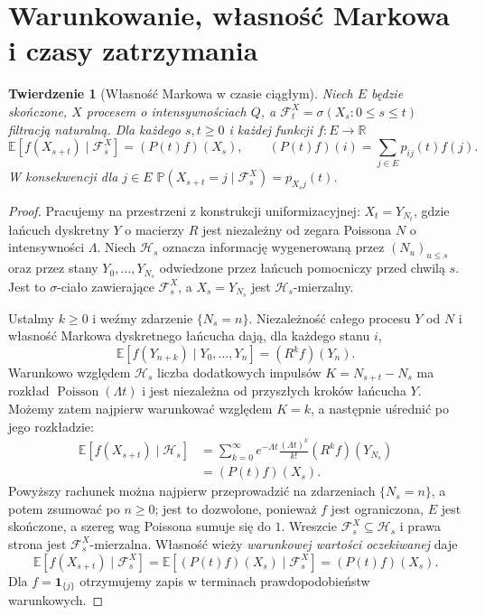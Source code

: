 \documentclass[11pt,a4paper,oneside]{report}
\numberwithin{equation}{chapter}
\theoremstyle{plain}
\newtheorem{twierdzenie}{Twierdzenie}[chapter]
\theoremstyle{definition}
\theoremstyle{remark}
\newcommand{\R}{\mathbb{R}}
\newcommand{\Prob}{\mathbb{P}}
\newcommand{\E}{\mathbb{E}}
\newcommand{\calF}{\mathcal{F}}
\newcommand{\calH}{\mathcal{H}}
\newcommand{\ind}[1]{\mathbf{1}_{#1}}
\begin{document}
\section{Warunkowanie, własność Markowa i czasy zatrzymania}
\begin{twierdzenie}[Własność Markowa w czasie ciągłym]
Niech $E$ będzie skończone, $X$ procesem o intensywnościach $Q$,
a $\calF_t^X=\sigma(X_s:0\le s\le t)$ filtracją naturalną.
Dla każdego $s,t\ge0$ i każdej funkcji $f:E\to\R$
\[
\E[f(X_{s+t})\mid\calF_s^X]=(P(t)f)(X_s),\qquad
(P(t)f)(i)=\sum_{j\in E}p_{ij}(t)f(j).
\]
W konsekwencji dla $j\in E$
$\Prob(X_{s+t}=j\mid\calF_s^X)=p_{X_sj}(t)$.
\end{twierdzenie}
\begin{proof}
Pracujemy na przestrzeni z konstrukcji uniformizacyjnej:
$X_t=Y_{N_t}$, gdzie łańcuch dyskretny $Y$ o macierzy $R$
jest niezależny od zegara Poissona $N$ o intensywności $\Lambda$.
Niech $\calH_s$ oznacza informację wygenerowaną przez
$(N_u)_{u\le s}$ oraz przez stany $Y_0,\ldots,Y_{N_s}$
odwiedzone przez łańcuch pomocniczy przed chwilą $s$.
Jest to $\sigma$-ciało zawierające $\calF_s^X$,
a $X_s=Y_{N_s}$ jest $\calH_s$-mierzalny.

Ustalmy $k\ge0$ i weźmy zdarzenie $\{N_s=n\}$.
Niezależność całego procesu $Y$ od $N$ i własność
Markowa dyskretnego łańcucha dają, dla każdego stanu $i$,
\[
\E[f(Y_{n+k})\mid Y_0,\ldots,Y_n]=(R^kf)(Y_n).
\]
Warunkowo względem $\calH_s$ liczba dodatkowych impulsów
$K=N_{s+t}-N_s$ ma rozkład $\operatorname{Poisson}(\Lambda t)$
i jest niezależna od przyszłych kroków łańcucha $Y$.
Możemy zatem najpierw warunkować względem $K=k$,
a następnie uśrednić po jego rozkładzie:
\[
\begin{aligned}
\E[f(X_{s+t})\mid\calH_s]
 &=\sum_{k=0}^\infty
 e^{-\Lambda t}\frac{(\Lambda t)^k}{k!}
 (R^kf)(Y_{N_s})\\
 &= (P(t)f)(X_s).
\end{aligned}
\]
Powyższy rachunek można najpierw przeprowadzić na zdarzeniach
$\{N_s=n\}$, a potem zsumować po $n\ge0$; jest to dozwolone,
ponieważ $f$ jest ograniczona, $E$ jest skończone,
a szereg wag Poissona sumuje się do $1$.
Wreszcie $\calF_s^X\subseteq\calH_s$ i prawa strona
jest $\calF_s^X$-mierzalna. Własność wieży
\emph{warunkowej wartości oczekiwanej} daje
\[
\E[f(X_{s+t})\mid\calF_s^X]
=\E[(P(t)f)(X_s)\mid\calF_s^X]
=(P(t)f)(X_s).
\]
Dla $f=\ind{\{j\}}$ otrzymujemy zapis
w terminach prawdopodobieństw warunkowych.
\end{proof}
\end{document}
